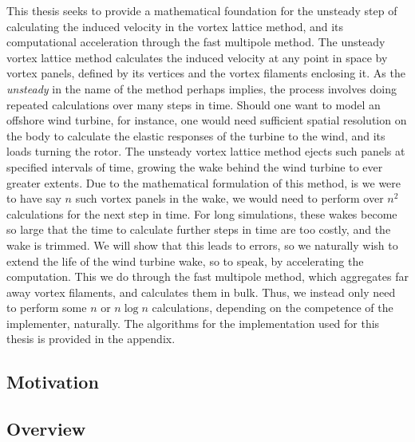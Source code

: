This thesis seeks to provide a mathematical foundation for the unsteady step of calculating the induced velocity in the vortex lattice method, and its computational acceleration through the fast multipole method.
The unsteady vortex lattice method calculates the induced velocity at any point in space by vortex panels, defined by its vertices and the vortex filaments enclosing it.
As the \emph{unsteady} in the name of the method perhaps implies, the process involves doing repeated calculations over many steps in time.
Should one want to model an offshore wind turbine, for instance, one would need sufficient spatial resolution on the body to calculate the elastic responses of the turbine to the wind, and its loads turning the rotor.
The unsteady vortex lattice method ejects such panels at specified intervals of time, growing the wake behind the wind turbine to ever greater extents.
Due to the mathematical formulation of this method, is we were to have say $n$ such vortex panels in the wake, we would need to perform over $n^2$ calculations for the next step in time.
For long simulations, these wakes become so large that the time to calculate further steps in time are too costly, and the wake is trimmed.
We will show that this leads to errors, so we naturally wish to extend the life of the wind turbine wake, so to speak, by accelerating the computation.
This we do through the fast multipole method, which aggregates far away vortex filaments, and calculates them in bulk.
Thus, we instead only need to perform some $n$ or $n\log{n}$ calculations, depending on the competence of the implementer, naturally.
The algorithms for the implementation used for this thesis is provided in the appendix.

\subsection{Motivation}


\subsection{Overview}

